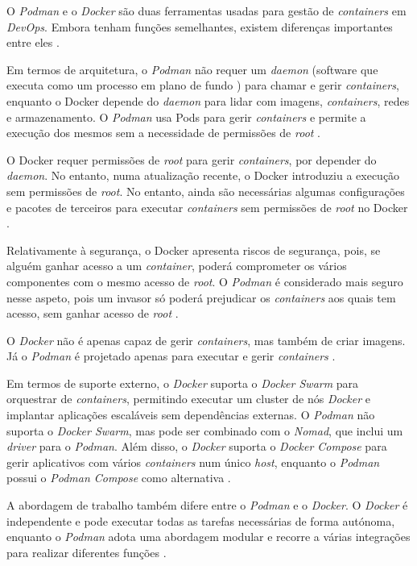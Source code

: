 O \textit{Podman} e o \textit{Docker} são duas ferramentas usadas para gestão de \textit{containers} em \textit{DevOps}. Embora tenham funções semelhantes, existem diferenças importantes entre eles \cite{podmanVsDocker}.

Em termos de arquitetura, o \textit{Podman} não requer um \textit{daemon} (software que executa como um processo em plano de fundo \cite{daemon}) para chamar e gerir \textit{containers}, enquanto o Docker depende do \textit{daemon} para lidar com imagens, \textit{containers}, redes e armazenamento. O \textit{Podman} usa Pods para gerir \textit{containers} e permite a execução dos mesmos sem a necessidade de permissões de \textit{root} \cite{podmanVsDocker}.

O Docker requer permissões de \textit{root} para gerir \textit{containers}, por depender do \textit{daemon}. No entanto, numa atualização recente, o Docker introduziu a execução sem permissões de \textit{root}. No entanto, ainda são necessárias algumas configurações e pacotes de terceiros para executar \textit{containers} sem permissões de \textit{root} no Docker \cite{podmanVsDocker}.

Relativamente à segurança, o Docker apresenta riscos de segurança, pois, se alguém ganhar acesso a um \textit{container}, poderá comprometer os vários componentes com o mesmo acesso de \textit{root}. O \textit{Podman} é considerado mais seguro nesse aspeto, pois um invasor só poderá prejudicar os \textit{containers} aos quais tem acesso, sem ganhar acesso de \textit{root} \cite{podmanVsDocker}.

O \textit{Docker} não é apenas capaz de gerir \textit{containers}, mas também de criar imagens. Já o \textit{Podman} é projetado apenas para executar e gerir \textit{containers} \cite{podmanVsDocker}.

Em termos de suporte externo, o \textit{Docker} suporta o \textit{Docker Swarm} para orquestrar de \textit{containers}, permitindo executar um cluster de nós \textit{Docker} e implantar aplicações escaláveis sem dependências externas. O \textit{Podman} não suporta o \textit{Docker Swarm}, mas pode ser combinado com o \textit{Nomad}, que inclui um \textit{driver} para o \textit{Podman}. Além disso, o \textit{Docker} suporta o \textit{Docker Compose} para gerir aplicativos com vários \textit{containers} num único \textit{host}, enquanto o \textit{Podman} possui o \textit{Podman Compose} como alternativa \cite{podmanVsDocker}.

A abordagem de trabalho também difere entre o \textit{Podman} e o \textit{Docker}. O \textit{Docker} é independente e pode executar todas as tarefas necessárias de forma autónoma, enquanto o \textit{Podman} adota uma abordagem modular e recorre a várias integrações para realizar diferentes funções \cite{podmanVsDocker}.

